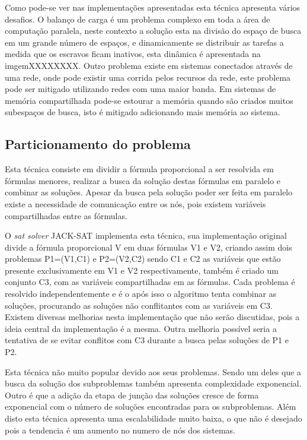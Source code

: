 \documentclass{ufsc-thesis}
\begin{document}
Como pode-se ver nas implementações apresentadas esta técnica apresenta vários desafios. O 
balanço de carga é um problema complexo em toda a área de computação paralela, neste contexto 
a solução esta na divisão do espaço de busca em um grande número de espaços, e dinamicamente 
se distribuir as tarefas a medida que os escravos ficam inativos, esta dinâmica é apresentada 
na imgemXXXXXXXX. Outro problema existe em sistemas conectados através de uma rede, onde pode 
existir uma corrida pelos recursos da rede, este problema pode ser mitigado utilizando redes 
com uma maior banda. Em sistemas de memória compartilhada pode-se estourar a memória quando 
são criados muitos subespaços de busca, isto é mitigado adicionando mais memória ao sistema.

\subsection{Particionamento do problema}

Esta técnica consiste em dividir a fórmula proporcional a ser resolvida em fórmulas menores,
realizar a busca da solução destas fórmulas em paralelo e combinar as soluções. Apesar da 
busca pela solução poder ser feita em paralelo existe a necessidade de comunicação entre os nós, 
pois existem variáveis compartilhadas entre as fórmulas.

O \textit{sat solver} JACK-SAT implementa esta técnica, sua implementação original divide a fórmula 
proporcional V em duas fórmulas V1 e V2, criando assim dois problemas P1=(V1,C1) e P2=(V2,C2) 
sendo C1 e C2 as variáveis que estão presente exclusivamente em V1 e V2 respectivamente, também 
é criado um conjunto C3, com as variáveis compartilhadas em as fórmulas. Cada problema é resolvido 
independentemente e é o após isso o algoritmo tenta combinar as soluções, procurando as soluções não 
conflitantes com as variáveis em C3. Existem diversas melhorias nesta implementação que não serão 
discutidas, pois a ideia central da implementação é a mesma. Outra melhoria possível seria a tentativa 
de se evitar conflitos com C3 durante a busca pelas soluções de P1 e P2.

Esta técnica não muito popular devido aos seus problemas. Sendo um deles que a busca da solução dos 
subproblemas também apresenta complexidade exponencial. Outro é que a adição da etapa de junção das 
soluções cresce de forma exponencial com o número de soluções encontradas para os subproblemas. Além 
disto esta técnica apresenta uma escalabilidade muito baixa, o que não é desejado pois a tendencia 
é um aumento no numero de nós dos sistemas.
\end{document}
